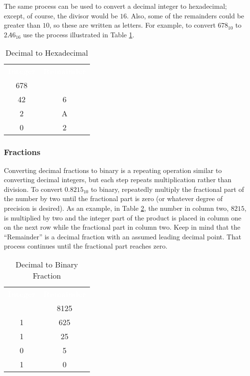 The same process can be used to convert a decimal integer to hexadecimal; except, of course, the divisor would be $ 16 $. Also, some of the remainders could be greater than $ 10 $, so these are written as letters. For example, to convert $ 678_{10} $ to $ 2A6_{16} $ use the process illustrated in Table \ref{MF:tab:dec_to_hex}.

\begin{table}[H]
  \sffamily
  \newcommand{\head}[1]{\textcolor{white}{\textbf{#1}}}    
  \begin{center}
    \begin{tabular}{ c c } 
      \hline
      \rowcolor{black!75}
      \head{Integer} & \head{Remainder} \\
      678 &  \\
      42 & 6 \\
      2 & A \\
      0 & 2 \\ \hline
    \end{tabular}
  \end{center}
  \caption{Decimal to Hexadecimal}
  \label{MF:tab:dec_to_hex}
\end{table}

\subsubsection{Fractions}
\label{MF:subsub:decimal_to_binary_fractions}
Converting decimal fractions to binary is a repeating operation similar to converting decimal integers, but each step repeats multiplication rather than division. To convert $ 0.8215_{10} $ to binary, repeatedly multiply the fractional part of the number by two until the fractional part is zero (or whatever degree of precision is desired). As an example, in Table \ref{MF:tab:dec_to_bin_fraction}, the number in column two, $ 8215 $, is multiplied by two and the integer part of the product is placed in column one on the next row while the fractional part in column two. Keep in mind that the ``Remainder'' is a decimal fraction with an assumed leading decimal point. That process continues until the fractional part reaches zero.

\begin{table}[H]
  \sffamily
  \newcommand{\head}[1]{\textcolor{white}{\textbf{#1}}}    
  \begin{center}
    \begin{tabular}{ c c } 
      \hline
      \rowcolor{black!75}
      \head{Integer} & \head{Remainder} \\
        & 8125 \\
      1 & 625 \\
      1 & 25 \\
      0 & 5 \\
      1 & 0 \\ \hline
    \end{tabular}
  \end{center}
  \caption{Decimal to Binary Fraction}
  \label{MF:tab:dec_to_bin_fraction}
\end{table}

